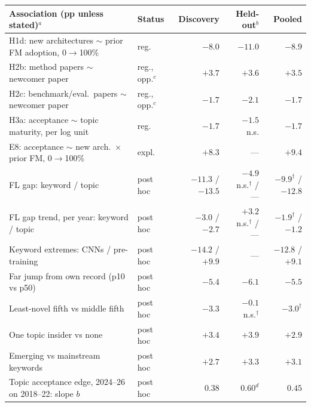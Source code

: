 \centering\scriptsize
\setlength{\tabcolsep}{4.5pt}\renewcommand{\arraystretch}{0.95}
\begin{tabular}{@{}llrrr@{}}
  \toprule
  Association (pp unless stated)$^a$ & Status & Discovery & Held-out$^b$ & Pooled \\
  \midrule
  H1d: new architectures $\sim$ prior FM adoption, 0$\to$100\% & reg. & $-8.0$ & $-11.0$ & $-8.9$ \\
  H2b: method papers $\sim$ newcomer paper & reg., opp.$^c$ & $+3.7$ & $+3.6$ & $+3.5$ \\
  H2c: benchmark/eval.\ papers $\sim$ newcomer paper & reg., opp.$^c$ & $-1.7$ & $-2.1$ & $-1.7$ \\
  H3a: acceptance $\sim$ topic maturity, per log unit & reg. & $-1.7$ & $-1.5$ n.s. & $-1.7$ \\
  \midrule
  E8: acceptance $\sim$ new arch.\ $\times$ prior FM, 0$\to$100\% & expl. & $+8.3$ & --- & $+9.4$ \\
  FL gap: keyword / topic & post hoc & $-11.3$ / $-13.5$ & $-4.9$ n.s.$^\dagger$ / --- & $-9.9^\dagger$ / $-12.8$ \\
  FL gap trend, per year: keyword / topic & post hoc & $-3.0$ / $-2.7$ & $+3.2$ n.s.$^\dagger$ / --- & $-1.9^\dagger$ / $-1.2$ \\
  Keyword extremes: CNNs / pre-training & post hoc & $-14.2$ / $+9.9$ & --- & $-12.8$ / $+9.1$ \\
  Far jump from own record (p10 vs p50) & post hoc & $-5.4$ & $-6.1$ & $-5.5$ \\
  Least-novel fifth vs middle fifth & post hoc & $-3.3$ & $-0.1$ n.s.$^\dagger$ & $-3.0^\dagger$ \\
  One topic insider vs none & post hoc & $+3.4$ & $+3.9$ & $+2.9$ \\
  Emerging vs mainstream keywords & post hoc & $+2.7$ & $+3.3$ & $+3.1$ \\
  Topic acceptance edge, 2024--26 on 2018--22: slope $b$ & post hoc & $0.38$ & $0.60^d$ & $0.45$ \\
  \bottomrule
\end{tabular}

